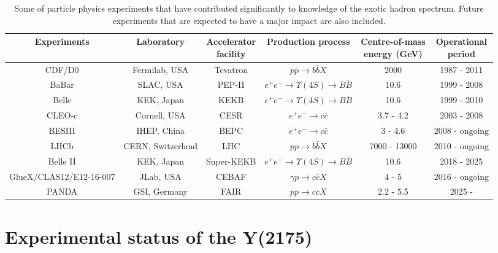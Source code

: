\begin{landscape}
    \vspace*{\fill}   
\begin{table}[H]
    \centering
    \small
    \setlength{\tabcolsep}{3pt}
    \caption{Some of particle physics experiments that have contributed significantly to knowledge of the exotic hadron spectrum. Future experiments that are expected to have a major impact are also included.}
    \label{tab.1.3}
    \begin{tabular}{cccccc}
        \hline
        Experiments & Laboratory & \thead{Accelerator \\ facility} & Production process & \thead{Centre-of-mass\\energy (GeV)} & \thead{Operational \\ period} \\
        \hline
        CDF/D0 & Fermilab, USA & Tevatron & $p\bar{p} \rightarrow b\bar{b}X$ & 2000 & 1987 - 2011 \\
        BaBar & SLAC, USA & PEP-II & $e^{+}e^{-} \rightarrow \Upsilon(4S) \rightarrow B\bar{B}$ & 10.6 & 1999 - 2008 \\
        Belle & KEK, Japan & KEKB & $e^{+}e^{-} \rightarrow \Upsilon(4S) \rightarrow B\bar{B}$ & 10.6 & 1999 - 2010 \\
        CLEO-c & Cornell, USA & CESR & $e^{+}e^{-} \rightarrow c\bar{c}$ & 3.7 - 4.2 & 2003 - 2008 \\
        BESIII & IHEP, China & BEPC & $e^{+}e^{-} \rightarrow  c\bar{c}$ & 3 - 4.6 & 2008 - ongoing \\
        LHCb & CERN, Switzerland & LHC & $pp \rightarrow b\bar{b}X$ & 7000 - 13000 & 2010 - ongoing \\
        Belle II & KEK, Japan & Super-KEKB & $e^{+}e^{-} \rightarrow \Upsilon(4S) \rightarrow B\bar{B}$ & 10.6 & 2018 - 2025 \\
        GlueX/CLAS12/E12-16-007 & JLab, USA & CEBAF & $\gamma p \rightarrow c\bar{c} X$ & 4 - 5 & 2016 - ongoing \\
        PANDA & GSI, Germany & FAIR & $p\bar{p} \rightarrow c\bar{c} X$ & 2.2 - 5.5 & 2025 -  \\
        \hline
    \end{tabular}
\end{table}
\vspace*{\fill}
\end{landscape}

\section{Experimental status of the Y(2175)}
\label{p.1.4}

